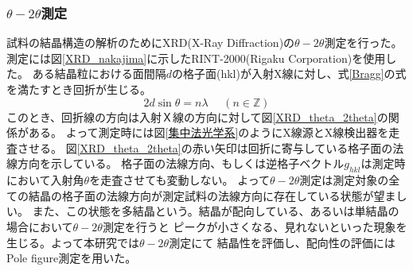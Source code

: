 \documentclass[dvipdfmx,12pt,a4paper]{jreport}
\begin{document}
			\subsubsection{$\theta - 2\theta$測定}
			試料の結晶構造の解析のためにXRD(X-Ray Diffraction)の$\theta-2\theta$測定を行った。
			測定には図\ref{XRD_nakajima}に示したRINT-2000(Rigaku Corporation)を使用した。
			ある結晶粒における面間隔$d$の格子面(hkl)が入射X線に対し、式\eqref{Bragg}の式を満たすとき回折が生じる。
			\begin{equation}
				2d \sin \theta = n \lambda \ \ \ \ \ \ (n\in \mathbb{Z})
				\label{Bragg}
			\end{equation}
			このとき、回折線の方向は入射Ｘ線の方向に対して図\ref{XRD_theta_2theta}の関係がある。
			よって測定時には図\ref{集中法光学系}のようにX線源とX線検出器を走査させる。
			図\ref{XRD_theta_2theta}の赤い矢印は回折に寄与している格子面の法線方向を示している。
			格子面の法線方向、もしくは逆格子ベクトル$g_{hkl}$は測定時において入射角$\theta$を走査させても変動しない。
			よって$\theta-2\theta$測定は測定対象の全ての結晶の格子面の法線方向が測定試料の法線方向に存在している状態が望ましい。
			また、この状態を多結晶という。結晶が配向している、あるいは単結晶の場合において$\theta-2\theta$測定を行うと
			ピークが小さくなる、見れないといった現象を生じる。よって本研究では$\theta-2\theta$測定にて
			結晶性を評価し、配向性の評価にはPole figure測定を用いた。
\end{document}
